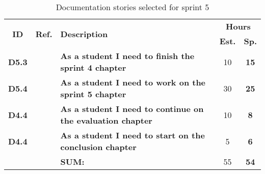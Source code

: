 
 \def\arraystretch{1.25}
 
\begin{longtable}{ccXcc}
  \label{tab:sprint5Documentationstories}\\[-6mm]
\caption{Documentation stories selected for sprint 5}\\[-4mm]

\toprule[0.5mm]
\multirow{2}{*}{\textbf{ID}} &
\multirow{2}{*}{\textbf{Ref.}} & \multirow{2}{*}{\textbf{Description}} & \multicolumn{2}{c}{\textbf{Hours}} \\
 					& & & \textbf{Est.} & \textbf{Sp.} \\
\midrule

	
\textbf{D5.3} 	&	& {\bf As a student I need to finish the sprint 4 chapter} 					&   10  & \textbf{15} \\

\textbf{D5.4} 	&	& {\bf As a student I need to work on the sprint 5 chapter} 					& 	30 	& \textbf{25} \\

\textbf{D4.4} 	&	& {\bf As a student I need to continue on the evaluation chapter} 			& 	10 	& \textbf{8} \\

\textbf{D4.4} 	&	& {\bf As a student I need to start on the conclusion chapter} 				& 	5 	& \textbf{6} \\


\midrule
		
				&	& \textbf{SUM:}		&		55	& \textbf{54}
 \\																			
\bottomrule[0.5mm]
\end{longtable}
